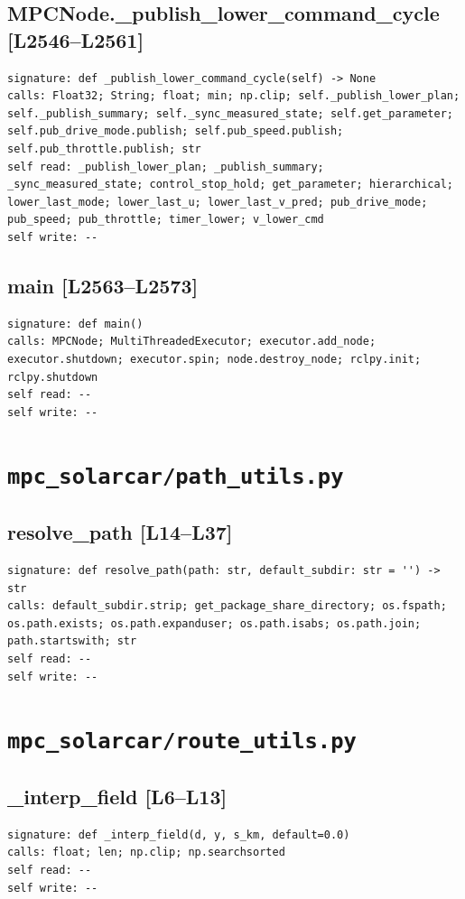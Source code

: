\documentclass[a4paper,10pt,oneside]{book}
\begin{document}
\subsection*{MPCNode.\_publish\_lower\_command\_cycle [L2546--L2561]}
\begin{lstlisting}[numbers=none]
signature: def _publish_lower_command_cycle(self) -> None
calls: Float32; String; float; min; np.clip; self._publish_lower_plan; self._publish_summary; self._sync_measured_state; self.get_parameter; self.pub_drive_mode.publish; self.pub_speed.publish; self.pub_throttle.publish; str
self read: _publish_lower_plan; _publish_summary; _sync_measured_state; control_stop_hold; get_parameter; hierarchical; lower_last_mode; lower_last_u; lower_last_v_pred; pub_drive_mode; pub_speed; pub_throttle; timer_lower; v_lower_cmd
self write: --
\end{lstlisting}
\subsection*{main [L2563--L2573]}
\begin{lstlisting}[numbers=none]
signature: def main()
calls: MPCNode; MultiThreadedExecutor; executor.add_node; executor.shutdown; executor.spin; node.destroy_node; rclpy.init; rclpy.shutdown
self read: --
self write: --
\end{lstlisting}
\section{\texttt{mpc\_solarcar/path\_utils.py}}
\subsection*{resolve\_path [L14--L37]}
\begin{lstlisting}[numbers=none]
signature: def resolve_path(path: str, default_subdir: str = '') -> str
calls: default_subdir.strip; get_package_share_directory; os.fspath; os.path.exists; os.path.expanduser; os.path.isabs; os.path.join; path.startswith; str
self read: --
self write: --
\end{lstlisting}
\section{\texttt{mpc\_solarcar/route\_utils.py}}
\subsection*{\_interp\_field [L6--L13]}
\begin{lstlisting}[numbers=none]
signature: def _interp_field(d, y, s_km, default=0.0)
calls: float; len; np.clip; np.searchsorted
self read: --
self write: --
\end{lstlisting}
\end{document}
